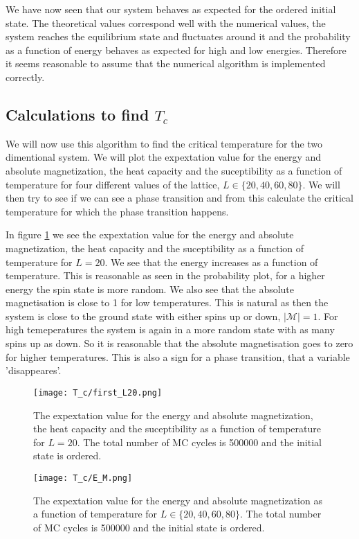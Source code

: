 \documentclass[11pt,a4wide]{article}
\begin{document}
We have now seen that our system behaves as expected for the ordered initial state. The theoretical values correspond well with the numerical values, the system reaches the equilibrium state and fluctuates around it and the probability as a function of energy behaves as expected for high and low energies. Therefore it seems reasonable to assume that the numerical algorithm is implemented correctly. 

\subsection{Calculations to find $T_c$}
We will now use this algorithm to find the critical temperature for the two dimentional system. We will plot the expextation value for the energy and absolute magnetization, the heat capacity and the suceptibility as a function of temperature for four different values of the lattice, $L\in \{20, 40, 60, 80\}$. We will then try to see if we can see a phase transition and from this calculate the critical temperature for which the phase transition happens. 

In figure \ref{fig:  T_C_20E_M} we see the expextation value for the energy and absolute magnetization, the heat capacity and the suceptibility as a function of temperature for $L=20$. We see that the energy increases as a function of temperature. This is reasonable as seen in the probability plot, for a higher energy the spin state is more random. We also see that the absolute magnetisation is close to 1 for low temperatures. This is natural as then the system is close to the ground state with either spins up or down, $|\mathcal{M}|=1$. For high temeperatures the system is again in a more random state with as many spins up as down. So it is reasonable that the absolute magnetisation goes to zero for higher temperatures. This is also a sign for a phase transition, that a variable 'disappeares'. 

\begin{figure}[htp]
\texttt{[image: T\_c/first\_L20.png]}
\caption{The expextation value for the energy and absolute magnetization, the heat capacity and the suceptibility as a function of temperature for $L=20$. The total number of MC cycles is 500000 and the initial state is ordered. }
\centering
\label{fig:  T_C_20E_M}
\end{figure}

\begin{figure}[htp]
\texttt{[image: T\_c/E\_M.png]}
\caption{The expextation value for the energy and absolute magnetization as a function of temperature for $L\in \{20, 40, 60, 80\}$. The total number of MC cycles is 500000 and the initial state is ordered. }
\centering
\label{fig:  T_C_E_M}
\end{figure}
\end{document}

